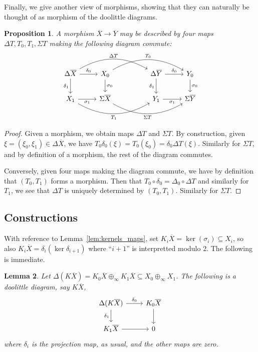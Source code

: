 \documentclass[a4paper,11pt]{article}
\theoremstyle{plain}
\newtheorem{proposition}{Proposition}[section]
\newtheorem{lemma}[proposition]{Lemma}
\theoremstyle{remark}
\begin{document}
Finally, we give another view of morphisms, showing that they can naturally be thought of as morphism of the doolittle diagrams.

\begin{proposition}\label{prop:morphisms_of_diagrams}
A morphism $\overline X \to \overline Y$ may be described by four maps $\Delta T, T_0, T_1, \Sigma T$ making the following diagram commute:
\[ \begin{tikzcd}
\Delta\overline X \arrow[r, "\delta_0"] \arrow[d, "\delta_1"']
\arrow[rrr, bend left, "\Delta T"]
& X_0 \arrow[d, "\sigma_0"] \arrow[rrr, bend left, "T_0"]
& &
\Delta\overline Y \arrow[r, "\delta_0"] \arrow[d, "\delta_1"'] & Y_0 \arrow[d, "\sigma_0"]
\\
X_1 \arrow[r, "\sigma_1"'] \arrow[rrr, bend right, "T_1"']
& \Sigma\overline X \arrow[rrr, bend right, "\Sigma T"']
& &
Y_1 \arrow[r, "\sigma_1"'] & \Sigma\overline Y
\end{tikzcd}
\]
\end{proposition}
\begin{proof}
Given a morphism, we obtain maps $\Delta T$ and $\Sigma T$.  By construction, given $\xi = (\xi_0,\xi_1) \in \Delta\overline X$, we have $T_0 \delta_0(\xi) = T_0(\xi_0) = \delta_0 \Delta T(\xi)$.  Similarly for $\Sigma T$, and by definition of a morphism, the rest of the diagram commutes.

Conversely, given four maps making the diagram commute, we have by definition that $(T_0,T_1)$ forms a morphism.  Then that $T_0 \circ \delta_0 = \Delta_0 \circ \Delta T$ and similarly for $T_1$, we see that $\Delta T$ is uniquely determined by $(T_0,T_1)$.  Similarly for $\Sigma T$.
\end{proof}


\subsection{Constructions}

With reference to Lemma~\ref{lem:kernels_maps}, set $K_i\overline X = \ker(\sigma_i) \subseteq X_i$, so also $K_i\overline X = \delta_i(\ker \delta_{i+1})$ where ``$i+1$'' is interpretted modulo $2$.  The following is immediate.

\begin{lemma}\label{lem:defn_K}
Let $\Delta (K\overline X) = K_0\overline X \oplus_\infty K_1\overline X \subseteq X_0\oplus_\infty X_1$.  The following is a doolittle diagram, say $K\overline X$,
\[ \begin{tikzcd} \Delta(K\overline X) \arrow[r, "\delta_0"] \arrow[d, "\delta_1"'] & K_0\overline X \arrow[d] \\
K_1\overline X \arrow[r] & 0
\end{tikzcd} \]
where $\delta_i$ is the projection map, as usual, and the other maps are zero.
\end{lemma}
\end{document}
